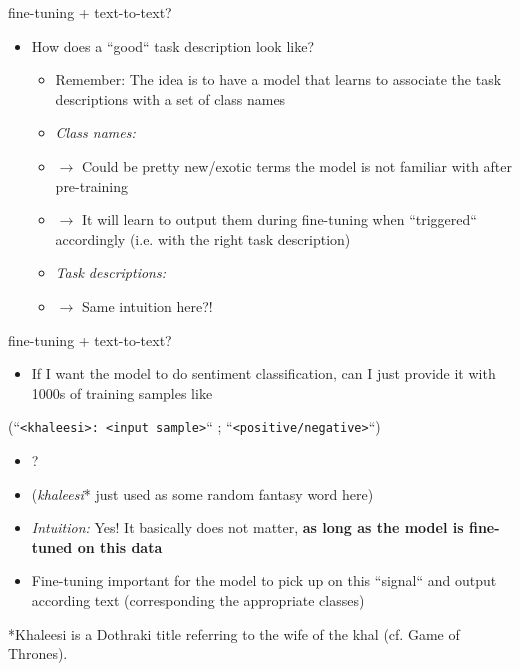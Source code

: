 \begin{frame}{fine-tuning + text-to-text?}

\vfill

\begin{itemize}
	\item \ques How does a ``good`` task description look like?
			\begin{itemize}
				\item Remember: The idea is to have a model that learns to associate the task descriptions with a set of class names
				\item \textit{Class names:} 
				\item[] $\to$ Could be pretty new/exotic terms the model is not familiar with after pre-training
				\item[] $\to$ It will learn to output them during fine-tuning when ``triggered`` accordingly (i.e. with the right task description)
				\item \textit{Task descriptions:} 
				\item[] $\to$ \ques Same intuition here?!
			\end{itemize}
\end{itemize}

\vfill

\end{frame}


\begin{frame}{fine-tuning + text-to-text?}

\vfill

\begin{itemize}
	\item \ques If I want the model to do sentiment classification, can I just provide it with 1000s of training samples like 
\end{itemize}

		\begin{center}
				{\small
					(``\texttt{<khaleesi>: <input sample>}`` ; ``\texttt{<positive/negative>}``)
				}
		\end{center}
				
\begin{itemize}
	\item[] ?
	\item[] (\textit{khaleesi}* just used as some random fantasy word here)
	\item \textit{Intuition:} Yes! It basically does not matter, \textbf{as long as the model is fine-tuned on this data}
	\item Fine-tuning important for the model to pick up on this ``signal`` and output according text (corresponding the appropriate classes)
\end{itemize}

\vfill

*\footnotesize{Khaleesi is a Dothraki title referring to the wife of the khal (cf. Game of Thrones).}

\end{frame}

